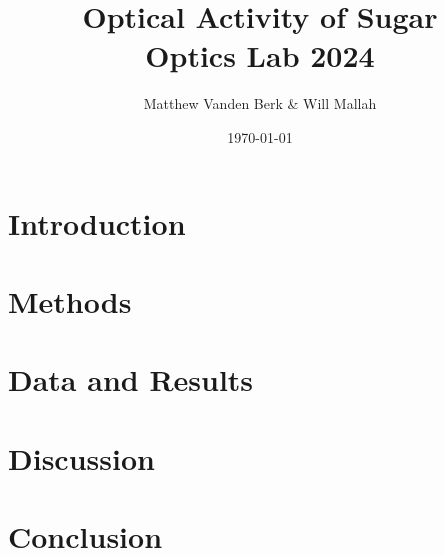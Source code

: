 \documentclass[12pt, letterpaper]{article}
\title{Optical Activity of Sugar \\
    \large Optics Lab 2024}
\author{Matthew Vanden Berk \& Will Mallah}
\affil{Department of Physics, Saint Vincent College}
\date{\today}
\begin{document}
    \maketitle

    \begin{abstract}
        
    \end{abstract}
\newpage

    \section{Introduction}
    

	\newpage
    \section{Methods}
    

	\newpage
    \section{Data and Results}
    

	\newpage
    \section{Discussion}
    
    
   	\newpage
    \section{Conclusion}
    

    \newpage
    
\end{document}

